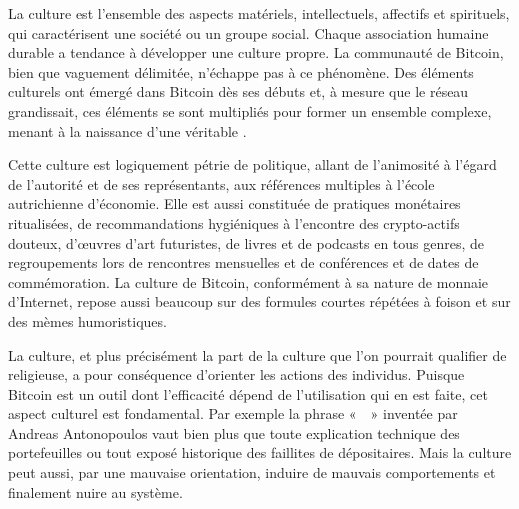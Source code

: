 La culture est l'ensemble des aspects matériels, intellectuels, affectifs et spirituels, qui caractérisent une société ou un groupe social. Chaque association humaine durable a tendance à développer une culture propre. La communauté de Bitcoin, bien que vaguement délimitée, n'échappe pas à ce phénomène. Des éléments culturels ont émergé dans Bitcoin dès ses débuts et, à mesure que le réseau grandissait, ces éléments se sont multipliés pour former un ensemble complexe, menant à la naissance d'une véritable .

Cette culture est logiquement pétrie de politique, allant de l'animosité à l'égard de l'autorité et de ses représentants, aux références multiples à l'école autrichienne d'économie. Elle est aussi constituée de pratiques monétaires ritualisées, de recommandations hygiéniques à l'encontre des crypto-actifs douteux, d'œuvres d'art futuristes, de livres et de podcasts en tous genres, de regroupements lors de rencontres mensuelles et de conférences et de dates de commémoration. La culture de Bitcoin, conformément à sa nature de monnaie d'Internet, repose aussi beaucoup sur des formules courtes répétées à foison et sur des mèmes humoristiques.

La culture, et plus précisément la part de la culture que l'on pourrait qualifier de religieuse, a pour conséquence d'orienter les actions des individus. Puisque Bitcoin est un outil dont l'efficacité dépend de l'utilisation qui en est faite, cet aspect culturel est fondamental. Par exemple la phrase «~~» inventée par Andreas Antonopoulos vaut bien plus que toute explication technique des portefeuilles ou tout exposé historique des faillites de dépositaires. Mais la culture peut aussi, par une mauvaise orientation, induire de mauvais comportements et finalement nuire au système. %

